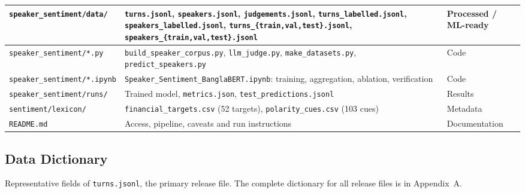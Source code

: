 \documentclass[11pt,a4paper]{article}
\begin{document}
\begin{longtable}{|L{4.5cm}|L{7.4cm}|L{2.4cm}|}
\texttt{speaker\_sentiment/}\newline\texttt{data/} & \texttt{turns.jsonl}, \texttt{speakers.jsonl}, \texttt{judgements.jsonl}, \texttt{turns\_labelled.jsonl}, \texttt{speakers\_labelled.jsonl}, \texttt{turns\_\{train,val,test\}.jsonl}, \texttt{speakers\_\{train,val,test\}.jsonl} & Processed / ML-ready \\ \hline
\texttt{speaker\_sentiment/}\newline\texttt{*.py} & \texttt{build\_speaker\_corpus.py}, \texttt{llm\_judge.py}, \texttt{make\_datasets.py}, \texttt{predict\_speakers.py} & Code \\ \hline
\texttt{speaker\_sentiment/}\newline\texttt{*.ipynb} & \texttt{Speaker\_Sentiment\_BanglaBERT.ipynb}: training, aggregation, ablation, verification & Code \\ \hline
\texttt{speaker\_sentiment/}\newline\texttt{runs/} & Trained model, \texttt{metrics.json}, \texttt{test\_predictions.jsonl} & Results \\ \hline
\texttt{sentiment/lexicon/}            & \texttt{financial\_targets.csv} (52 targets), \texttt{polarity\_cues.csv} (103 cues) & Metadata \\ \hline
\texttt{README.md}                     & Access, pipeline, caveats and run instructions & Documentation \\ \hline
\end{longtable}
\addtocounter{table}{-1}
\endgroup

\subsection{Data Dictionary}

Representative fields of \texttt{turns.jsonl}, the primary release file. The complete dictionary
for all release files is in Appendix~A.
\end{document}
